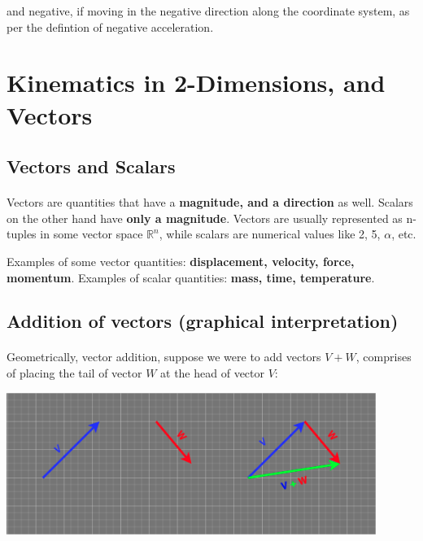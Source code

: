 \documentclass[12pt, a4paper]{article}
\begin{document}
and negative, if moving in the negative direction along the coordinate system, as per the defintion of
negative acceleration.


\newpage

\section{Kinematics in 2-Dimensions, and Vectors}

\subsection{Vectors and Scalars}
\paragraph*{}
Vectors are quantities that have a \textbf{magnitude, and a direction} as well. Scalars on the other hand
have \textbf{only a magnitude}. Vectors are usually represented as n-tuples in some vector space 
$\mathbb{R} ^n$, while scalars are numerical values like 2, 5, $\alpha$, etc.

Examples of some vector quantities: \textbf{displacement, velocity, force, momentum}. Examples of scalar quantities:
\textbf{mass, time, temperature}.

\subsection{Addition of vectors (graphical interpretation)}
\paragraph*{}
Geometrically, vector addition, suppose we were to add vectors $V + W$, comprises of 
placing the tail of vector $W$ at the head of vector $V$: \\

{
    \centering
    \includegraphics[width=12cm]{phys_vector_add_geom.png}

}
\end{document}
